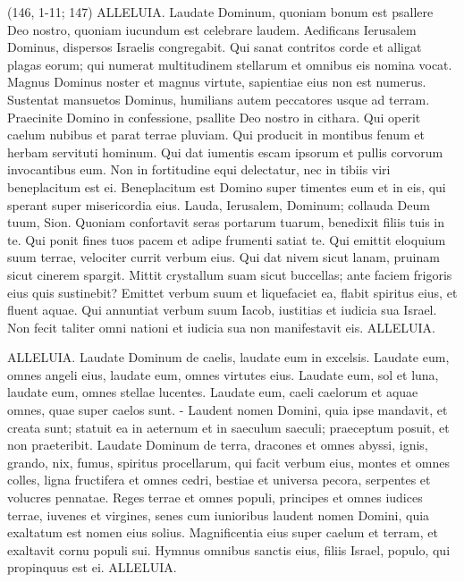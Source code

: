 \begin{biblechapter}  (146, 1-11; 147) 
\verse ALLELUIA. Laudate Dominum, quoniam bonum est psallere Deo nostro, quoniam iucundum est celebrare laudem. 
\verse Aedificans Ierusalem Dominus, dispersos Israelis congregabit. 
\verse Qui sanat contritos corde et alligat plagas eorum; 
\verse qui numerat multitudinem stellarum et omnibus eis nomina vocat. 
\verse Magnus Dominus noster et magnus virtute, sapientiae eius non est numerus. 
\verse Sustentat mansuetos Dominus, humilians autem peccatores usque ad terram. 
\verse Praecinite Domino in confessione, psallite Deo nostro in cithara. 
\verse Qui operit caelum nubibus et parat terrae pluviam. Qui producit in montibus fenum et herbam servituti hominum. 
\verse Qui dat iumentis escam ipsorum et pullis corvorum invocantibus eum. 
\verse Non in fortitudine equi delectatur, nec in tibiis viri beneplacitum est ei. 
\verse Beneplacitum est Domino super timentes eum et in eis, qui sperant super misericordia eius. 
\verse Lauda, Ierusalem, Dominum; collauda Deum tuum, Sion. 
\verse Quoniam confortavit seras portarum tuarum, benedixit filiis tuis in te. 
\verse Qui ponit fines tuos pacem et adipe frumenti satiat te. 
\verse Qui emittit eloquium suum terrae, velociter currit verbum eius. 
\verse Qui dat nivem sicut lanam, pruinam sicut cinerem spargit. 
\verse Mittit crystallum suam sicut buccellas; ante faciem frigoris eius quis sustinebit? 
\verse Emittet verbum suum et liquefaciet ea, flabit spiritus eius, et fluent aquae. 
\verse Qui annuntiat verbum suum Iacob, iustitias et iudicia sua Israel. 
\verse Non fecit taliter omni nationi et iudicia sua non manifestavit eis. ALLELUIA. 
\end{biblechapter}

\begin{biblechapter}  
\verse ALLELUIA. Laudate Dominum de caelis, laudate eum in excelsis. 
\verse Laudate eum, omnes angeli eius, laudate eum, omnes virtutes eius. 
\verse Laudate eum, sol et luna, laudate eum, omnes stellae lucentes. 
\verse Laudate eum, caeli caelorum et aquae omnes, quae super caelos sunt. - 
\verse Laudent nomen Domini, quia ipse mandavit, et creata sunt; 
\verse statuit ea in aeternum et in saeculum saeculi; praeceptum posuit, et non praeteribit. 
\verse Laudate Dominum de terra, dracones et omnes abyssi, 
\verse ignis, grando, nix, fumus, spiritus procellarum, qui facit verbum eius, 
\verse montes et omnes colles, ligna fructifera et omnes cedri, 
\verse bestiae et universa pecora, serpentes et volucres pennatae. 
\verse Reges terrae et omnes populi, principes et omnes iudices terrae, 
\verse iuvenes et virgines, senes cum iunioribus 
\verse laudent nomen Domini, quia exaltatum est nomen eius solius. Magnificentia eius super caelum et terram, 
\verse et exaltavit cornu populi sui. Hymnus omnibus sanctis eius, filiis Israel, populo, qui propinquus est ei. ALLELUIA. 
\end{biblechapter}

